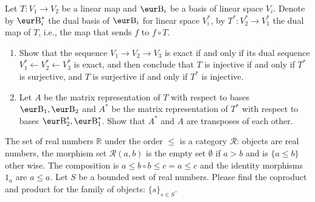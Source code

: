 \begin{problem}
Let $T \colon V_1 \to V_2$ be a linear map and $\B_i$ be a basis of linear space $V_i$. Denote by $\B_i^*$ the dual basis of $\B_i$ for linear space $V_i^*$, by $T^* \colon V_2^* \to V_1^*$ the dual map of $T$, i.e., the map that sends $f$ to $f \circ T$.
\begin{enumerate}
  \item Show that the sequence $V_1 \to V_2 \to V_3$ is exact if and only if its dual sequence $V_1^* \leftarrow V_2^* \leftarrow V_3^*$ is exact, and then conclude that $T$ is injective if and only if $T^*$ is surjective, and $T$ is surjective if and only if $T^*$ is injective.
  \item Let $A$ be the matrix representation of $T$ with respect to bases $\B_1, \B_2$ and $A^*$ be the matrix representation of $T^*$ with respect to bases $\B_2^*, \B_1^*$. Show that $A^*$ and $A$ are transposes of each other.
\end{enumerate}
\end{problem}

\begin{problem}
The set of real numbers $\mathbb{R}$ under the order $\leq$ is a category $\mathcal{R}$: objects are real numbers, the morphism set $\mathcal{R}(a, b)$ is the empty set $\emptyset$ if $a > b$ and is $\{ a \leq b \}$ other wise. The composition is $a \leq b \circ b \leq c = a \leq c$ and the identity morphisms $1_a$ are $a \leq a$. Let $S$ be a bounded sest of real numbers. Please find the coproduct and product for the family of objects: ${\{ s \}}_{s \in S}$.
\end{problem}
